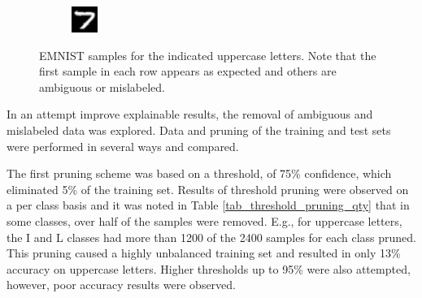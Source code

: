 \documentclass[conference]{IEEEtran}
\begin{document}
\begin{figure}[h]
\begin{subfigure}{.10\textwidth}
        \label{fig:issue_T03}
    \end{subfigure}%
    \begin{subfigure}{.10\textwidth}
        \centering
        \includegraphics[width=.90\textwidth]{./images/issues/T-04.png}
        \label{fig:issue_T04}
    \end{subfigure}
    \caption{EMNIST samples for the indicated uppercase letters.  Note that the first sample in each row appears as expected and others are ambiguous or mislabeled.}
    \label{fig:emnist_samples}
\end{figure}

In an attempt improve explainable results, the removal of ambiguous and
mislabeled data was explored. Data and pruning of the training and test sets
were performed in several ways and compared.

The first pruning scheme was based on a threshold, of 75\% confidence, which
eliminated 5\% of the training set. Results of threshold pruning were observed
on a per class basis and it was noted in Table \ref{tab_threshold_pruning_qty}
that in some classes, over half of the samples were removed.  E.g., for
uppercase letters, the I and L classes had more than 1200 of the 2400 samples
for each class pruned. This pruning caused a highly unbalanced training set and
resulted in only 13\% accuracy on uppercase letters.  Higher thresholds up to
95\% were also attempted, however, poor accuracy results were observed.
\end{document}
